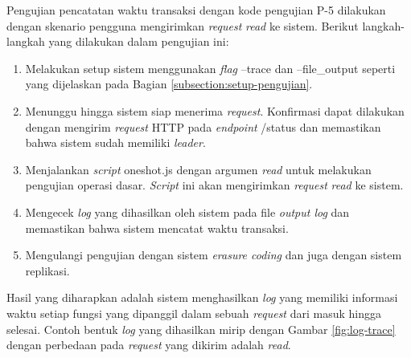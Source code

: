 Pengujian pencatatan waktu transaksi dengan kode pengujian P-5 dilakukan dengan skenario pengguna mengirimkan \textit{request} \textit{read} ke sistem. Berikut langkah-langkah yang dilakukan dalam pengujian ini:

\begin{enumerate}
  \item Melakukan setup sistem menggunakan \textit{flag} --trace dan --file\_output seperti yang dijelaskan pada Bagian \ref{subsection:setup-pengujian}.
  \item Menunggu hingga sistem siap menerima \textit{request}. Konfirmasi dapat dilakukan dengan mengirim \textit{request} HTTP pada \textit{endpoint} /status dan memastikan bahwa sistem sudah memiliki \textit{leader}.
  \item Menjalankan \textit{script} oneshot.js dengan argumen \textit{read} untuk melakukan pengujian operasi dasar. \textit{Script} ini akan mengirimkan \textit{request} \textit{read} ke sistem.
  \item Mengecek \textit{log} yang dihasilkan oleh sistem pada file \textit{output log} dan memastikan bahwa sistem mencatat waktu transaksi.
  \item Mengulangi pengujian dengan sistem \textit{erasure coding} dan juga dengan sistem replikasi.
\end{enumerate}

Hasil yang diharapkan adalah sistem menghasilkan \textit{log} yang memiliki informasi waktu setiap fungsi yang dipanggil dalam sebuah \textit{request} dari masuk hingga selesai. Contoh bentuk \textit{log} yang dihasilkan mirip dengan Gambar \ref{fig:log-trace} dengan perbedaan pada \textit{request} yang dikirim adalah \textit{read}.